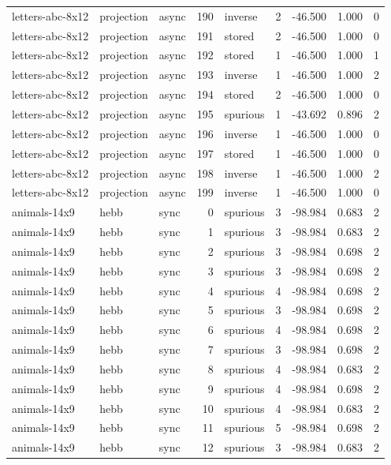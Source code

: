 \begin{tabular}{lllrlrrrr}
letters-abc-8x12 & projection & async & 190 & inverse & 2 & -46.500 & 1.000 & 0 \\
letters-abc-8x12 & projection & async & 191 & stored & 2 & -46.500 & 1.000 & 0 \\
letters-abc-8x12 & projection & async & 192 & stored & 1 & -46.500 & 1.000 & 1 \\
letters-abc-8x12 & projection & async & 193 & inverse & 1 & -46.500 & 1.000 & 2 \\
letters-abc-8x12 & projection & async & 194 & stored & 2 & -46.500 & 1.000 & 0 \\
letters-abc-8x12 & projection & async & 195 & spurious & 1 & -43.692 & 0.896 & 2 \\
letters-abc-8x12 & projection & async & 196 & inverse & 1 & -46.500 & 1.000 & 0 \\
letters-abc-8x12 & projection & async & 197 & stored & 1 & -46.500 & 1.000 & 0 \\
letters-abc-8x12 & projection & async & 198 & inverse & 1 & -46.500 & 1.000 & 2 \\
letters-abc-8x12 & projection & async & 199 & inverse & 1 & -46.500 & 1.000 & 0 \\
animals-14x9 & hebb & sync & 0 & spurious & 3 & -98.984 & 0.683 & 2 \\
animals-14x9 & hebb & sync & 1 & spurious & 3 & -98.984 & 0.683 & 2 \\
animals-14x9 & hebb & sync & 2 & spurious & 3 & -98.984 & 0.698 & 2 \\
animals-14x9 & hebb & sync & 3 & spurious & 3 & -98.984 & 0.698 & 2 \\
animals-14x9 & hebb & sync & 4 & spurious & 4 & -98.984 & 0.698 & 2 \\
animals-14x9 & hebb & sync & 5 & spurious & 3 & -98.984 & 0.698 & 2 \\
animals-14x9 & hebb & sync & 6 & spurious & 4 & -98.984 & 0.698 & 2 \\
animals-14x9 & hebb & sync & 7 & spurious & 3 & -98.984 & 0.698 & 2 \\
animals-14x9 & hebb & sync & 8 & spurious & 4 & -98.984 & 0.683 & 2 \\
animals-14x9 & hebb & sync & 9 & spurious & 4 & -98.984 & 0.698 & 2 \\
animals-14x9 & hebb & sync & 10 & spurious & 4 & -98.984 & 0.683 & 2 \\
animals-14x9 & hebb & sync & 11 & spurious & 5 & -98.984 & 0.698 & 2 \\
animals-14x9 & hebb & sync & 12 & spurious & 3 & -98.984 & 0.683 & 2 \\

\end{tabular}
